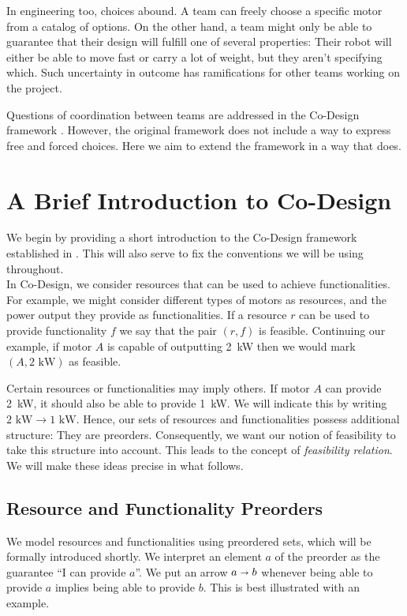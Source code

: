 \documentclass[12pt]{article}
\theoremstyle{definition}
\theoremstyle{plain}
\theoremstyle{plain}
\theoremstyle{plain}
\theoremstyle{plain}
\theoremstyle{remark}
\theoremstyle{remark}
\begin{document}
In engineering too, choices abound. A team can freely choose a specific motor from a catalog of options. On the other hand, a team might only be able to guarantee that their design will fulfill one of several properties: Their robot will either be able to move fast or carry a lot of weight, but they aren't specifying which. Such uncertainty in outcome has ramifications for other teams working on the project. 

Questions of coordination between teams are addressed in the Co-Design framework \cite{Censi2015}. However, the original framework does not include a way to express free and forced choices. Here we aim to extend the framework in a way that does. 

\section{A Brief Introduction to Co-Design}
We begin by providing a short introduction to the Co-Design framework established in \cite{Censi2015}. This will also serve to fix the conventions we will be using throughout. \\

In Co-Design, we consider resources that can be used to achieve functionalities. For example, we might consider different types of motors as resources, and the power output they provide as functionalities. If a resource $r$ can be used to provide functionality $f$ we say that the pair $(r,f)$ is feasible. Continuing our example, if motor $A$ is capable of outputting \mbox{2 kW} then we would mark $(A,\text{2 kW})$ as feasible.

Certain resources or functionalities may imply others. If motor $A$ can provide \mbox{2 kW}, it should also be able to provide \mbox{1 kW}. We will indicate this by writing $2 \text{ kW} \rightarrow 1 \text{ kW}$. Hence, our sets of resources and functionalities possess additional structure: They are preorders. Consequently, we want our notion of feasibility to take this structure into account. This leads to the concept of \emph{feasibility relation}. We will make these ideas precise in what follows.

\subsection{Resource and Functionality Preorders}

We model resources and functionalities using preordered sets, which will be formally introduced shortly. We interpret an element $a$ of the preorder as the guarantee ``I can provide $a$''. We put an arrow $a \shortrightarrow b$ whenever being able to provide $a$ implies being able to provide $b$. This is best illustrated with an example.
\end{document}
